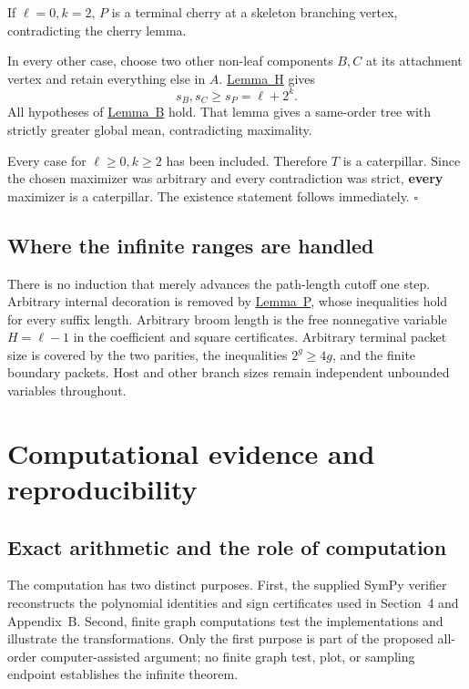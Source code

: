 \documentclass[11pt,reqno]{amsart}
\theoremstyle{plain}
\begin{document}
If \(\ell=0,k=2\), \(P\) is a terminal cherry at a skeleton branching vertex, contradicting the cherry lemma.

In every other case, choose two other non-leaf components \(B,C\) at its attachment vertex and retain everything else in \(A\). \hyperref[lem:host]{Lemma~H} gives \[
s_B,s_C\ge s_P=\ell+2^k.
\] All hypotheses of \hyperref[lem:broom]{Lemma~B} hold. That lemma gives a same-order tree with strictly greater global mean, contradicting maximality.

Every case for \(\ell\ge0,k\ge2\) has been included. Therefore \(T\) is a caterpillar. Since the chosen maximizer was arbitrary and every contradiction was strict, \textbf{every} maximizer is a caterpillar. The existence statement follows immediately. \hfill\(\square\)

\subsection*{Where the infinite ranges are handled}\label{where-the-infinite-ranges-are-handled}

There is no induction that merely advances the path-length cutoff one step. Arbitrary internal decoration is removed by \hyperref[lem:packet]{Lemma~P}, whose inequalities hold for every suffix length. Arbitrary broom length is the free nonnegative variable \(H=\ell-1\) in the coefficient and square certificates. Arbitrary terminal packet size is covered by the two parities, the inequalities \(2^g\ge4g\), and the finite boundary packets. Host and other branch sizes remain independent unbounded variables throughout.


\FloatBarrier
\section{Computational evidence and reproducibility}\label{verification-independence-and-reproducibility}

\subsection{Exact arithmetic and the role of computation}
The computation has two distinct purposes. First, the supplied SymPy verifier
\cite{MeurerEtAl2017} reconstructs the polynomial identities and sign
certificates used in Section~4 and Appendix~B. Second, finite graph computations
test the implementations and illustrate the transformations. Only the first
purpose is part of the proposed all-order computer-assisted argument; no finite
graph test, plot, or sampling endpoint establishes the infinite theorem.
\end{document}
